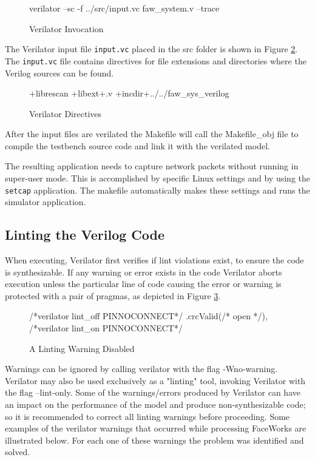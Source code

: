 \documentclass[defaultstyle,10pt,master,Helvetica]{thesis}
\begin{document}
\begin{figure}[h]
\begin{boxedverbatim}
verilator --sc -f ../src/input.vc faw_system.v --trace
\end{boxedverbatim}
\caption{Verilator Invocation}
\label{fig:veriflagstrace}
\end{figure}

The Verilator input file {\tt input.vc} placed in the src folder is shown in Figure \ref{fig:inputfile}. The {\tt input.vc} file contains directives for file extensions and directories where the Verilog sources can be found.

\begin{figure}[h]
\begin{boxedverbatim}
+librescan +libext+.v
+incdir+../../faw_sys_verilog
\end{boxedverbatim}
\caption{Verilator Directives}
\label{fig:inputfile}
\end{figure}

After the input files are verilated the Makefile will call the Makefile\_obj file to compile the testbench source code and link it with the verilated model.

The resulting application needs to capture network packets without running in super-user mode. This is accomplished by specific Linux settings and by using the {\tt setcap} application. The makefile automatically makes these settings and runs the simulator application.

\subsection{Linting the Verilog Code}

When executing, Verilator first verifies if lint violations exist, to ensure the code is synthesizable. If any warning or error exists in the code Verilator aborts execution unless the particular line of code causing the error or warning is protected with a pair of pragmas, as depicted in Figure \ref{fig:lintdisable}.

\begin{figure}[h]
\begin{boxedverbatim}
/*verilator lint_off PINNOCONNECT*/
.crcValid(/* open */),
/*verilator lint_on PINNOCONNECT*/
\end{boxedverbatim}
\caption{A Linting Warning Disabled}
\label{fig:lintdisable}
\end{figure}

Warnings can be ignored by calling verilator with the flag -Wno-warning. Verilator may also be used exclusively as a "linting" tool, invoking Verilator with the flag --lint-only.
Some of the warnings/errors produced by Verilator can have an impact on the performance of the model and produce non-synthesizable code; so it is recommended to correct all linting warnings before proceeding. Some examples of the verilator warnings that occurred while processing FaceWorks are illustrated below. For each one of these warnings the problem was identified and solved.
\clearpage
\end{document}
